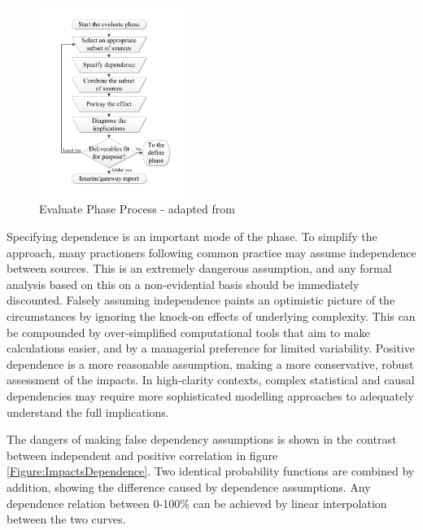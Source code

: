 \begin{figure}[!h]
  \centering
    \includegraphics[width = 0.42\textwidth]{./Figures/Evaluate.pdf} 
\caption{Evaluate Phase Process - adapted from \cite{chapman}}
\label{Figure:Evaluate}
\end{figure}

Specifying dependence is an important mode of the phase.
To simplify the approach, many practioners following common practice may assume independence between sources.
This is an extremely dangerous assumption, and any formal analysis based on this on a non-evidential basis should be immediately discounted.
Falsely assuming independence paints an optimistic picture of the circumstances by ignoring the knock-on effects of underlying complexity.
This can be compounded by over-simplified computational tools that aim to make calculations easier, and by a managerial preference for limited variability. 
Positive dependence is a more reasonable assumption, making a more conservative, robust assessment of the impacts. 
In high-clarity contexts, complex statistical and causal dependencies may require more sophisticated modelling approaches to adequately understand the full implications.

The dangers of making false dependency assumptions is shown in the contrast between independent and positive correlation in figure \ref{Figure:ImpactsDependence}.
Two identical probability functions are combined by addition, showing the difference caused by dependence assumptions.
Any dependence relation between 0-100\% can be achieved by linear interpolation between the two curves.

